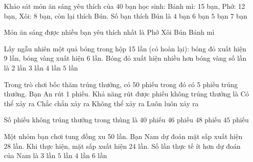 \begin{ex} %
Khảo sát món ăn sáng yêu thích của 40 bạn học sinh: Bánh mì: 15 bạn, Phở: 12 bạn, Xôi: 8 bạn, còn lại thích Bún. Số bạn thích Bún là
\choice
{$4$ bạn}
{$6$ bạn}
{\True $5$ bạn}
{$7$ bạn}
\end{ex}

\begin{ex} %
Món ăn sáng được nhiều bạn yêu thích nhất là
\choice
{Phở}
{Xôi}
{Bún}
{\True Bánh mì}
\end{ex}

\begin{ex} %
Lấy ngẫu nhiên một quả bóng trong hộp 15 lần (có hoàn lại): bóng đỏ xuất hiện 9 lần, bóng vàng xuất hiện 6 lần. Bóng đỏ xuất hiện nhiều hơn bóng vàng số lần là
\choice
{$2$ lần}
{\True $3$ lần}
{$4$ lần}
{$5$ lần}
\end{ex}

\begin{ex} %
Trong trò chơi bốc thăm trúng thưởng, có 50 phiếu trong đó có 5 phiếu trúng thưởng. Bạn An rút 1 phiếu. Khả năng rút được phiếu không trúng thưởng là
\choice
{\True Có thể xảy ra}
{Chắc chắn xảy ra}
{Không thể xảy ra}
{Luôn luôn xảy ra}
\end{ex}

\begin{ex} %
Số phiếu không trúng thưởng trong thùng là
\choice
{$40$ phiếu}
{$46$ phiếu}
{$48$ phiếu}
{\True $45$ phiếu}
\end{ex}

\begin{ex} %
Một nhóm bạn chơi tung đồng xu 50 lần. Bạn Nam dự đoán mặt sấp xuất hiện 28 lần. Khi thực hiện, mặt sấp xuất hiện 24 lần. Số lần thực tế ít hơn dự đoán của Nam là
\choice
{$3$ lần}
{$5$ lần}
{\True $4$ lần}
{$6$ lần}
\end{ex}

